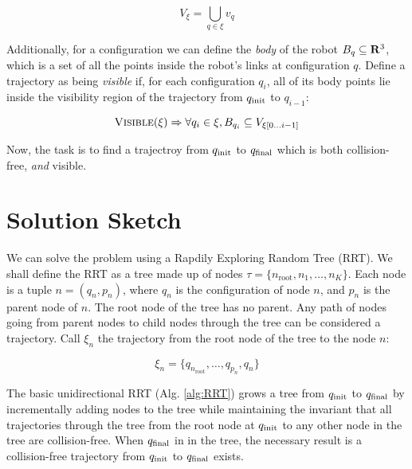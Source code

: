 \documentclass[conference]{IEEEtran}
\begin{document}
\begin{equation}
V_\xi= \bigcup_{q \in \xi} v_q 
\end{equation}

Additionally, for a configuration we can define the \textit{body} of the robot
$B_q \subseteq \mathbf{R}^3$, which is a set of all the points inside the robot's
links at configuration $q$.  Define a trajectory as being \textit{visible} if, 
for each configuration $q_i$, all of its body points lie inside the visibility
region of the trajectory from $q_{\text{init}}$ to $q_{i - 1}$:

\begin{equation}
\textsc{Visible}(\xi) \Rightarrow \forall q_i \in \xi, B_{q_i} \subseteq
V_{\xi[0\ldots i - 1]}
\end{equation}

Now, the task is to find a trajectroy from $q_{\text{init}}$ to $q_{\text{final}}$ which is both
collision-free, \emph{and}  visible.

\section{Solution Sketch}

We can solve the problem using a Rapdily Exploring Random Tree (RRT). We shall
define the RRT as a tree made up of nodes $\tau = \{n_{\text{root}}, n_1,
\ldots, n_K\}$.
Each node is a tuple $n = (q_n, p_n)$, where $q_n$ is the configuration of node $n$, and
$p_n$ is the parent node of $n$. The root node of the tree has no parent. Any
path of nodes going from parent nodes to child nodes through the tree can be
considered a trajectory. Call $\xi_n$ the trajectory from the root node of the
tree to the node $n$: 

\begin{equation}
\xi_n = \{q_{n_{\text{root}}}, \ldots, q_{p_n},  q_n\} 
\end{equation}

The basic unidirectional RRT (Alg. \ref{alg:RRT}) grows a tree from $q_{\text{init}}$ to
$q_{\text{final}}$ by incrementally adding nodes to the tree while maintaining the invariant that all
trajectories through the tree from the root node at $q_{\text{init}}$ to any other node
in the tree are collision-free. When $q_{\text{final}}$ in in the tree, the necessary result is a
collision-free trajectory from $q_{\text{init}}$ to $q_{\text{final}}$ exists.
\end{document}
